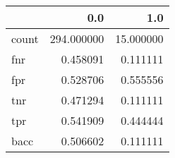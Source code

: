 \begin{tabular}{lrr}
\toprule
{} &         0.0 &        1.0 \\
\midrule
count &  294.000000 &  15.000000 \\
fnr   &    0.458091 &   0.111111 \\
fpr   &    0.528706 &   0.555556 \\
tnr   &    0.471294 &   0.111111 \\
tpr   &    0.541909 &   0.444444 \\
bacc  &    0.506602 &   0.111111 \\
\bottomrule
\end{tabular}
